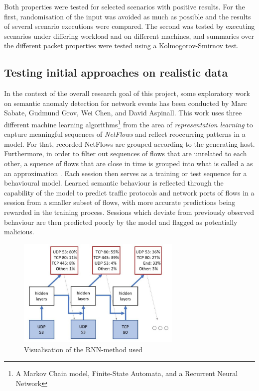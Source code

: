 \documentclass[a4paper,12pt,twoside]{report}
\begin{document}
Both properties were tested for selected scenarios with positive results. For the first, randomisation of the input was avoided as much as possible and the results of several scenario executions were compared. The second was tested by executing scenarios under differing workload and on different machines, and summaries over the different packet properties were tested using a Kolmogorov-Smirnov test. 




\subsection{Testing initial approaches on realistic data}\label{Prevwork}

In the context of the overall research goal of this project, some exploratory work on semantic anomaly detection for network events has been conducted by Marc Sabate, Gudmund Grov, Wei Chen, and David Aspinall. This work uses three different machine learning algorithms\footnote{A Markov Chain model, Finite-State Automata, and a Recurrent Neural Network} from the area of \textit{representation learning} to capture meaningful sequences of \textit{NetFlows} and reflect reoccurring patterns in a model. For that, recorded NetFlows are grouped according to the generating host. Furthermore, in order to filter out sequences of flows that are unrelated to each other, a squence of flows that are close in time is grouped into what is called a  as an approximation . Each session then serves as a training or test sequence for a behavioural model. Learned semantic behaviour is reflected through the capability of the model to predict traffic protocols and network ports of flows in a session from a smaller subset of flows, with more accurate predictions being rewarded in the training process. Sessions which deviate from previously observed behaviour are then predicted poorly by the model and flagged as potentially malicious.

\begin{figure}
\centering
\includegraphics[width=0.7\textwidth]{images/RNN.jpg}
\caption{Visualisation of the RNN-method used}\label{RNN}
\end{figure}
\end{document}
